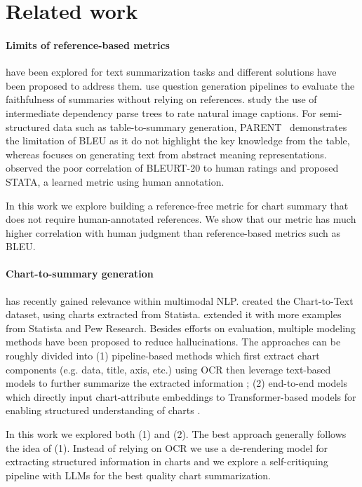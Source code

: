 \section{Related work}

\paragraph{Limits of reference-based metrics} have been explored for text summarization tasks and different solutions have been proposed to address them.
\citet{scialom-etal-2019-answers, scialom-etal-2021-questeval, fabbri-etal-2022-qafacteval} use question generation pipelines to evaluate the faithfulness of summaries without relying on references.
\citet{spice} study the use of intermediate dependency parse trees to rate natural image captions. 
For semi-structured data such as table-to-summary generation, PARENT~\cite{dhingra-etal-2019-handling} demonstrates the limitation of BLEU as it do not highlight the key knowledge from the table, whereas \citet{opitz-frank-2021-towards} focuses on generating text from abstract meaning representations. 
\citet{gehrmann2022tata} observed the poor correlation of BLEURT-20 to human ratings and proposed STATA, a learned metric using human annotation.

In this work we explore building a reference-free metric for chart summary that does not require human-annotated references. We show that our metric \metric has much higher correlation with human judgment than reference-based metrics such as BLEU.

\paragraph{Chart-to-summary generation} has recently gained relevance within multimodal NLP.
\citet{obeid-hoque-2020-chart} created the Chart-to-Text dataset, using charts extracted from Statista. \citet{kantharaj-etal-2022-chart} extended it with more examples from Statista and Pew Research.
Besides efforts on evaluation, multiple modeling methods have been proposed to reduce hallucinations. The approaches can be roughly divided into (1) pipeline-based methods which first extract chart components (e.g. data, title, axis, etc.) using OCR then leverage text-based models to further summarize the extracted information \citet{kantharaj-etal-2022-chart, choi2019visualizing}; (2) end-to-end models which directly input chart-attribute embeddings to Transformer-based models for enabling structured understanding of charts \cite{obeid-hoque-2020-chart}. 

In this work we explored both (1) and (2). The best approach \pipeline{} generally follows the idea of (1). Instead of relying on OCR we use a de-rendering model for extracting structured information in charts and we explore a self-critiquing pipeline with LLMs for the best quality chart summarization. 

